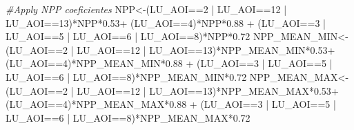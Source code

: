 \documentclass[
  10pt,
  b5paper,
]{book}
\newenvironment{Shaded}{\begin{snugshade}}{\end{snugshade}}
\newcommand{\CommentTok}[1]{\textcolor[rgb]{0.56,0.35,0.01}{\textit{#1}}}
\newcommand{\DecValTok}[1]{\textcolor[rgb]{0.00,0.00,0.81}{#1}}
\newcommand{\FloatTok}[1]{\textcolor[rgb]{0.00,0.00,0.81}{#1}}
\newcommand{\NormalTok}[1]{#1}
\newcommand{\OtherTok}[1]{\textcolor[rgb]{0.56,0.35,0.01}{#1}}
\newcommand{\SpecialCharTok}[1]{\textcolor[rgb]{0.00,0.00,0.00}{#1}}
\begin{document}
\begin{Shaded}
\begin{Highlighting}[]
\CommentTok{\#Apply NPP coeficientes}
\NormalTok{NPP}\OtherTok{\textless{}{-}}\NormalTok{(LU\_AOI}\SpecialCharTok{==}\DecValTok{2} \SpecialCharTok{|}\NormalTok{ LU\_AOI}\SpecialCharTok{==}\DecValTok{12} \SpecialCharTok{|}\NormalTok{ LU\_AOI}\SpecialCharTok{==}\DecValTok{13}\NormalTok{)}\SpecialCharTok{*}\NormalTok{NPP}\SpecialCharTok{*}\FloatTok{0.53}\SpecialCharTok{+}\NormalTok{ (LU\_AOI}\SpecialCharTok{==}\DecValTok{4}\NormalTok{)}\SpecialCharTok{*}\NormalTok{NPP}\SpecialCharTok{*}\FloatTok{0.88} \SpecialCharTok{+}\NormalTok{ (LU\_AOI}\SpecialCharTok{==}\DecValTok{3} \SpecialCharTok{|}\NormalTok{ LU\_AOI}\SpecialCharTok{==}\DecValTok{5} \SpecialCharTok{|}\NormalTok{ LU\_AOI}\SpecialCharTok{==}\DecValTok{6} \SpecialCharTok{|}\NormalTok{ LU\_AOI}\SpecialCharTok{==}\DecValTok{8}\NormalTok{)}\SpecialCharTok{*}\NormalTok{NPP}\SpecialCharTok{*}\FloatTok{0.72}
\NormalTok{NPP\_MEAN\_MIN}\OtherTok{\textless{}{-}}\NormalTok{(LU\_AOI}\SpecialCharTok{==}\DecValTok{2} \SpecialCharTok{|}\NormalTok{ LU\_AOI}\SpecialCharTok{==}\DecValTok{12} \SpecialCharTok{|}\NormalTok{ LU\_AOI}\SpecialCharTok{==}\DecValTok{13}\NormalTok{)}\SpecialCharTok{*}\NormalTok{NPP\_MEAN\_MIN}\SpecialCharTok{*}\FloatTok{0.53}\SpecialCharTok{+}\NormalTok{ (LU\_AOI}\SpecialCharTok{==}\DecValTok{4}\NormalTok{)}\SpecialCharTok{*}\NormalTok{NPP\_MEAN\_MIN}\SpecialCharTok{*}\FloatTok{0.88} \SpecialCharTok{+}\NormalTok{ (LU\_AOI}\SpecialCharTok{==}\DecValTok{3} \SpecialCharTok{|}\NormalTok{ LU\_AOI}\SpecialCharTok{==}\DecValTok{5} \SpecialCharTok{|}\NormalTok{ LU\_AOI}\SpecialCharTok{==}\DecValTok{6} \SpecialCharTok{|}\NormalTok{ LU\_AOI}\SpecialCharTok{==}\DecValTok{8}\NormalTok{)}\SpecialCharTok{*}\NormalTok{NPP\_MEAN\_MIN}\SpecialCharTok{*}\FloatTok{0.72}
\NormalTok{NPP\_MEAN\_MAX}\OtherTok{\textless{}{-}}\NormalTok{(LU\_AOI}\SpecialCharTok{==}\DecValTok{2} \SpecialCharTok{|}\NormalTok{ LU\_AOI}\SpecialCharTok{==}\DecValTok{12} \SpecialCharTok{|}\NormalTok{ LU\_AOI}\SpecialCharTok{==}\DecValTok{13}\NormalTok{)}\SpecialCharTok{*}\NormalTok{NPP\_MEAN\_MAX}\SpecialCharTok{*}\FloatTok{0.53}\SpecialCharTok{+}\NormalTok{ (LU\_AOI}\SpecialCharTok{==}\DecValTok{4}\NormalTok{)}\SpecialCharTok{*}\NormalTok{NPP\_MEAN\_MAX}\SpecialCharTok{*}\FloatTok{0.88} \SpecialCharTok{+}\NormalTok{ (LU\_AOI}\SpecialCharTok{==}\DecValTok{3} \SpecialCharTok{|}\NormalTok{ LU\_AOI}\SpecialCharTok{==}\DecValTok{5} \SpecialCharTok{|}\NormalTok{ LU\_AOI}\SpecialCharTok{==}\DecValTok{6} \SpecialCharTok{|}\NormalTok{ LU\_AOI}\SpecialCharTok{==}\DecValTok{8}\NormalTok{)}\SpecialCharTok{*}\NormalTok{NPP\_MEAN\_MAX}\SpecialCharTok{*}\FloatTok{0.72}



\end{Highlighting}
\end{Shaded}
\end{document}
